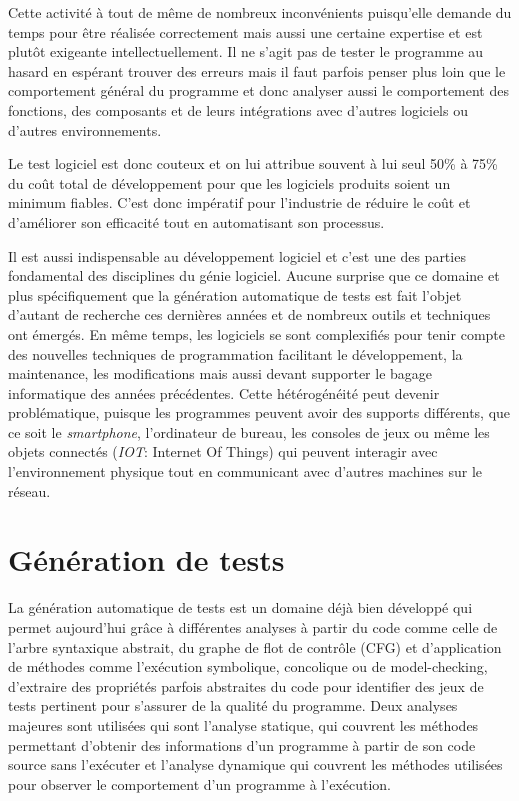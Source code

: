 Cette activité à tout de même de nombreux inconvénients puisqu'elle demande du temps pour être réalisée correctement mais aussi une certaine expertise et est plutôt exigeante intellectuellement. Il ne s'agit pas de tester le programme au hasard en espérant trouver des erreurs mais il faut parfois penser plus loin que le comportement général du programme et donc analyser aussi le comportement des fonctions, des composants et de leurs intégrations avec d'autres logiciels ou d'autres environnements.

Le test logiciel est donc couteux et on lui attribue souvent à lui seul 50\% à 75\% du coût total de développement\cite{software-cost} pour que les logiciels produits soient un minimum fiables. C'est donc impératif pour l'industrie de réduire le coût et d'améliorer son efficacité tout en automatisant son processus. 

Il est aussi indispensable au développement logiciel et c'est une des parties fondamental des disciplines du génie logiciel. Aucune surprise que ce domaine et plus spécifiquement que la génération automatique de tests est fait l'objet d'autant de recherche ces dernières années et de nombreux outils et techniques ont émergés\cite{orchestrated-survey-automated-test}.
En même temps, les logiciels se sont complexifiés pour tenir compte des nouvelles techniques de programmation facilitant le développement, la maintenance, les modifications mais aussi devant supporter le bagage informatique des années précédentes. Cette hétérogénéité peut devenir problématique, puisque les programmes peuvent avoir des supports différents, que ce soit le \textit{smartphone}, l'ordinateur de bureau, les consoles de jeux ou même les objets connectés (\textit{IOT}: Internet Of Things) qui peuvent interagir avec l'environnement physique tout en communicant avec d'autres machines sur le réseau.

\section{Génération de tests}
La génération automatique de tests\cite{orchestrated-survey-automated-test} est un domaine déjà bien développé qui permet aujourd'hui grâce à différentes analyses à partir du code comme celle de l'arbre syntaxique abstrait, du graphe de flot de contrôle (CFG) et d'application de méthodes comme l'exécution symbolique, concolique ou de model-checking, d'extraire des propriétés parfois abstraites du code pour identifier des jeux de tests pertinent pour s'assurer de la qualité du programme\cite{EFSM}.
Deux analyses majeures sont utilisées qui sont l'analyse statique, qui couvrent les méthodes permettant d'obtenir des informations d'un programme à partir de son code source sans l'exécuter et l'analyse dynamique qui couvrent les méthodes utilisées pour observer le comportement d'un programme à l'exécution.

